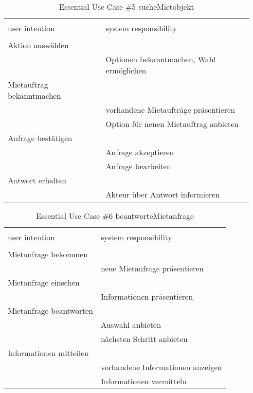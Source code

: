 \begin{table}[H]
\caption{Essential Use Case \#5 sucheMietobjekt }
\centering
\begin{tabular}{l l}
\\ [-0.5ex]

\hline\hline
\\ [-0.5ex]
user intention & system responsibility
\\ [1.5ex]
\hline
\\ [-0.5ex]
Aktion auswählen 			& 											 \\[1ex]
							& Optionen bekanntmachen, Wahl ermöglichen	 \\[1ex]
Mietauftrag bekanntmachen	& 											 \\[1ex]
							& vorhandene Mietaufträge präsentieren		 \\[1ex]
							& Option für neuen Mietauftrag anbieten      \\[1ex]
Anfrage bestätigen   		& 											 \\[1ex] 
							& Anfrage akzeptieren						 \\[1ex]
							& Anfrage bearbeiten \\[1ex]
Antwort erhalten			& 											 \\[1ex]
							& Akteur über Antwort informieren			 \\[1ex]

\hline
\end{tabular}
\label{tab:mietobjekt}
\end{table}



\begin{table}[H]
\caption{Essential Use Case \#6 beantworteMietanfrage }
\centering
\begin{tabular}{l l}
\\ [-0.5ex]

\hline\hline
\\ [-0.5ex]
user intention & system responsibility
\\ [1.5ex]
\hline
\\ [-0.5ex]
Mietanfrage bekommen 		& 											 \\[1ex]
							& neue Mietanfrage präsentieren				 \\[1ex]
Mietanfrage einsehen		& 											 \\[1ex]
							& Informationen präsentieren				 \\[1ex]
Mietanfrage beantworten  	& 											 \\[1ex] 
							& Auswahl anbieten							 \\[1ex]
							& nächsten Schritt anbieten					 \\[1ex]
Informationen mitteilen		& 											 \\[1ex]
							& vorhandene Informationen anzeigen			 \\[1ex]
							& Informationen vermitteln					 \\[1ex]


\hline
\end{tabular}
\label{tab:mietanfrage}
\end{table}

